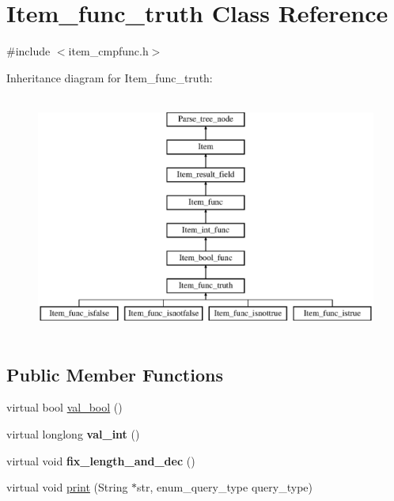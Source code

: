 \hypertarget{classItem__func__truth}{}\section{Item\+\_\+func\+\_\+truth Class Reference}
\label{classItem__func__truth}


{\ttfamily \#include $<$item\+\_\+cmpfunc.\+h$>$}

Inheritance diagram for Item\+\_\+func\+\_\+truth\+:\begin{figure}[H]
\begin{center}
\leavevmode
\includegraphics[height=8.000000cm]{classItem__func__truth}
\end{center}
\end{figure}
\subsection*{Public Member Functions}
\begin{DoxyCompactItemize}
\item 
virtual bool \mbox{\hyperlink{classItem__func__truth_a1c0f8cdf192cec99a3e0b5eafa1845bf}{val\+\_\+bool}} ()
\item 
\mbox{\label{classItem__func__truth_ae0ab634e7c2813949eba092d20dc3394}} 
virtual longlong {\bfseries val\+\_\+int} ()
\item 
\mbox{\label{classItem__func__truth_a76ff27fcdbcdac84cc8902195d978748}} 
virtual void {\bfseries fix\+\_\+length\+\_\+and\+\_\+dec} ()
\item 
virtual void \mbox{\hyperlink{classItem__func__truth_aa17f138c8366c33e377d3e64384415c1}{print}} (String $\ast$str, enum\+\_\+query\+\_\+type query\+\_\+type)
\end{DoxyCompactItemize}
